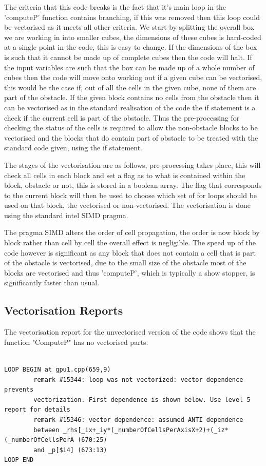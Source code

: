 \documentclass[paper=a4, fontsize=11pt]{scrartcl}
\numberwithin{equation}{section}		%
\numberwithin{figure}{section}			%
\numberwithin{table}{section}				%
\begin{document}
The criteria that this code breaks is the fact that it's main loop in the 'computeP' function contains branching, if this was removed then this loop could be vectorised as it meets all other criteria. We start by splitting the overall box we are working in into smaller cubes, the dimensions of these cubes is hard-coded at a single point in the code, this is easy to change. If the dimensions of the box is such that it cannot be made up of complete cubes then the code will halt. If the input variables are such that the box can be made up of a whole number of cubes then the code will move onto working out if a given cube can be vectorised, this would be the case if, out of all the cells in the given cube, none of them are part of the obstacle. If the given block contains no cells from the obstacle then it can be vectorised as in the standard realisation of the code the if statement is a check if the current cell is part of the obstacle. Thus the pre-processing for checking the status of the cells is required to allow the non-obstacle blocks to be vectorised and the blocks that do contain part of obstacle to be treated with the standard code given, using the if statement.

The stages of the vectorisation are as follows, pre-processing takes place, this will check all cells in each block and set a flag as to what is contained within the block, obstacle or not, this is stored in a boolean array. The flag that corresponds to the current block will then be used to choose which set of for loops should be used on that block, the vectorised or non-vectorised. The vectorisation is done using the standard intel SIMD pragma.

The pragma SIMD alters the order of cell propagation, the order is now block by block rather than cell by cell the overall effect is negligible. The speed up of the code however is significant as any block that does not contain a cell that is part of the obstacle is vectorised, due to the small size of the obstacle most of the blocks are vectorised and thus 'computeP', which is typically a show stopper, is significantly faster than usual. 

\subsection{Vectorisation Reports}

The vectorisation report for the unvectorised version of the code shows that the function "ComputeP" has no vectorised parts.
\begin{lstlisting}

LOOP BEGIN at gpu1.cpp(659,9)
        remark #15344: loop was not vectorized: vector dependence prevents 
        vectorization. First dependence is shown below. Use level 5 report for details
        remark #15346: vector dependence: assumed ANTI dependence 
        between _rhs[_ix+_iy*(_numberOfCellsPerAxisX+2)+(_iz*(_numberOfCellsPerA (670:25) 
        and _p[$i4] (673:13)
LOOP END

\end{lstlisting}
\end{document}
